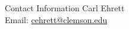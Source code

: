 \documentclass[final]{beamer}
\newlength{\onecolwid}
\begin{document}
\begin{frame}[t]
\begin{columns}[t]
\begin{column}{\onecolwid}
\begin{alertblock}{Contact Information}
\centering Carl Ehrett\\
\centering Email: \href{mailto:cehrett@clemson.edu}{cehrett@clemson.edu}

\end{alertblock}



\end{column} %

\end{columns} %

\end{frame} %
\end{document}
